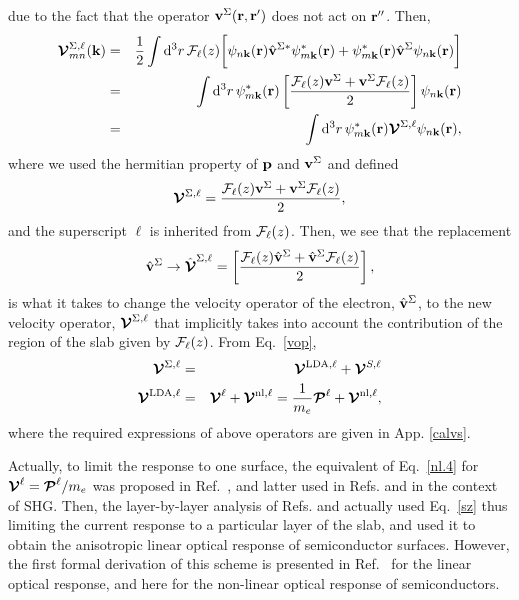 \documentclass[floatfix,prb,aps,superscriptaddress,11pt,preprint]{revtex4}
\begin{document}
due to the fact that the operator $\mathbf{v}^\Sigma(\mathbf{r},\mathbf{r}')$ does not act on
$\mathbf{r}''$. Then,
\begin{eqnarray}\label{nl.3}
\boldsymbol{\mathcal{\cal V}}^{\Sigma,\ell}_{mn}({\mathbf k})
&=&
\frac{1}{2}
\int \mathrm{d}^3 r\,
 {\mathbf{\cal F}}_\ell(z)
 \bigg[
\psi_{n\mathbf{k}}(\mathbf{r})
\hat{\mathbf{v}}^{\Sigma *}\psi^*_{m\mathbf{k}}(\mathbf{r})
+ 
\psi^*_{m\mathbf{k}}(\mathbf{r})\hat{\mathbf{v}}^\Sigma
\psi_{n\mathbf{k}}(\mathbf{r})
\bigg]
\nonumber\\
&=&
\int \mathrm{d}^3 r\,
\psi^*_{m\mathbf{k}}(\mathbf{r})
\left[\frac{{\mathbf{\cal F}}_\ell(z) \mathbf{v}^\Sigma +
\mathbf{v}^\Sigma {\mathbf{\cal F}}_\ell(z)}{2}\right]
\psi_{n\mathbf{k}}(\mathbf{r})
\nonumber\\
&=&
\int \mathrm{d}^3 r\,
\psi^*_{m\mathbf{k}}(\mathbf{r})
\boldsymbol{\mathcal{\cal V}}^{\Sigma,\ell}
\psi_{n\mathbf{k}}(\mathbf{r})
,
\end{eqnarray}
where we used the hermitian property of $\mathbf{p}$ and $\mathbf{v}^\Sigma$ and  defined
\begin{eqnarray}\label{nl.4}
\boldsymbol{\mathcal{\cal V}}^{\Sigma,\ell}
=
\frac{{\mathbf{\cal F}}_\ell(z) \mathbf{v}^\Sigma +
\mathbf{v}^\Sigma {\mathbf{\cal F}}_\ell(z)}{2}
,
\end{eqnarray} 
and the superscript $\ell$ is inherited from ${\mathbf{\cal F}}_\ell(z)$. 
Then,
we see that the replacement
\begin{equation}\label{vcali}
\hat{\mathbf{v}}^\Sigma \to \hat{\boldsymbol{\mathcal{\cal V}}}^{\Sigma,\ell}=\left[\frac{{\mathbf{\cal F}}_\ell(z) \hat{\mathbf{v}}^\Sigma +
\hat{\mathbf{v}}^\Sigma {\mathbf{\cal F}}_\ell(z)}{2}\right],
\end{equation} 
is what it takes to change the
velocity operator of the electron, $\hat{\mathbf{v}}^\Sigma$, to the new velocity
operator, $\boldsymbol{\mathcal{\cal V}}^{\Sigma,\ell}$
 that implicitly takes into account the
contribution of the region of the slab given by ${\mathbf{\cal F}}_\ell(z)$.
From Eq.~\eqref{vop},
\begin{eqnarray}\label{vopii}
\boldsymbol{\mathcal{\cal V}}^{\Sigma,\ell}
&=&
\boldsymbol{\mathcal{\cal V}}^{\mathrm{LDA},\ell}
+
\boldsymbol{\mathcal{\cal V}}^{S,\ell}
\nonumber\\
\boldsymbol{\mathcal{\cal V}}^{\mathrm{LDA},\ell}
&=&
\boldsymbol{\mathcal{\cal V}}^{\ell}
+
\boldsymbol{\mathcal{\cal V}}^{\mathrm{nl},\ell}
=
\frac{1}{m_e}
\boldsymbol{\mathcal{\cal P}}^{\ell}
+
\boldsymbol{\mathcal{\cal V}}^{\mathrm{nl},\ell}
,
\end{eqnarray}
where the required expressions of above operators
are given in 
App. \ref{calvs}.

Actually, 
to limit the response to one surface, 
the equivalent of Eq.~\eqref{nl.4} for $\boldsymbol{\mathcal{\cal V}}^\ell=\boldsymbol{\mathcal{\cal P}}^\ell/m_e$
 was proposed 
in Ref.~, and latter used in Refs.
and  in the context of SHG. Then, 
the layer-by-layer analysis of Refs.  
and 
actually used Eq.~\eqref{sz}
thus limiting the current response
to a particular layer of the slab, and used it to obtain the
anisotropic linear optical response of semiconductor surfaces.
However, the first formal derivation of this scheme is presented in
Ref.~ for the linear optical response, and
here for the non-linear optical response of semiconductors.
\end{document}
